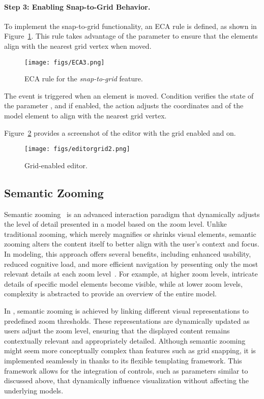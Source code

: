 \paragraph{Step 3: Enabling Snap-to-Grid Behavior.}
To implement the snap-to-grid functionality, an ECA rule is defined, as shown in Figure~\ref{fig:eca}. This rule takes advantage of the  parameter to ensure that the elements align with the nearest grid vertex when moved.
%
\begin{figure}[h]
\centering
\texttt{[image: figs/ECA3.png]}
\caption{ECA rule for the \textit{snap-to-grid} feature.}
\label{fig:eca}
\end{figure}
%
The event   is triggered when an element is moved. Condition  verifies the state of the parameter , and if enabled, the action  adjusts the coordinates  and  of the model element to align with the nearest grid vertex.  

Figure~\ref{fig:editor-grid} provides a screenshot of the editor with the grid enabled and  on.

\begin{figure}[h!]
\centering
\texttt{[image: figs/editorgrid2.png]}
\caption{Grid-enabled editor.}
\label{fig:editor-grid}
\end{figure}

\subsection{Semantic Zooming}
Semantic zooming~\cite{frisch2008towards} is an advanced interaction paradigm that dynamically adjusts the level of detail presented in a model based on the zoom level. Unlike traditional zooming, which merely magnifies or shrinks visual elements, semantic zooming alters the content itself to better align with the user’s context and focus. In modeling, this approach offers several benefits, including enhanced usability, reduced cognitive load, and more efficient navigation by presenting only the most relevant details at each zoom level~\cite{pirolli2001focus}. For example, at higher zoom levels, intricate details of specific model elements become visible, while at lower zoom levels, complexity is abstracted to provide an overview of the entire model.

In \jjodel{}, semantic zooming is achieved by linking different visual representations to predefined zoom thresholds. These representations are dynamically updated as users adjust the zoom level, ensuring that the displayed content remains contextually relevant and appropriately detailed. Although semantic zooming might seem more conceptually complex than features such as grid snapping, it is implemented seamlessly in \jjodel{} thanks to its flexible templating framework. This framework allows for the integration of controls, such as parameters similar to  discussed above, that dynamically influence visualization without affecting the underlying models.

